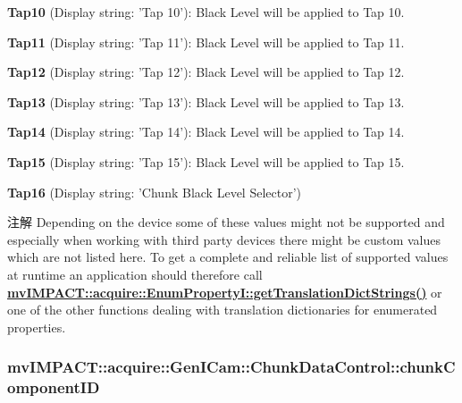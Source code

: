 \begin{DoxyItemize}
\item {\bfseries Tap10} (Display string\+: 'Tap 10')\+: Black Level will be applied to Tap 10.
\item {\bfseries Tap11} (Display string\+: 'Tap 11')\+: Black Level will be applied to Tap 11.
\item {\bfseries Tap12} (Display string\+: 'Tap 12')\+: Black Level will be applied to Tap 12.
\item {\bfseries Tap13} (Display string\+: 'Tap 13')\+: Black Level will be applied to Tap 13.
\item {\bfseries Tap14} (Display string\+: 'Tap 14')\+: Black Level will be applied to Tap 14.
\item {\bfseries Tap15} (Display string\+: 'Tap 15')\+: Black Level will be applied to Tap 15.
\item {\bfseries Tap16} (Display string\+: 'Chunk Black Level Selector')
\end{DoxyItemize}

\begin{DoxyNote}{注解}
Depending on the device some of these values might not be supported and especially when working with third party devices there might be custom values which are not listed here. To get a complete and reliable list of supported values at runtime an application should therefore call {\bfseries \hyperlink{classmv_i_m_p_a_c_t_1_1acquire_1_1_enum_property_i_a0ba6ccbf5ee69784d5d0b537924d26b6}{mv\+I\+M\+P\+A\+C\+T\+::acquire\+::\+Enum\+Property\+I\+::get\+Translation\+Dict\+Strings()}} or one of the other functions dealing with translation dictionaries for enumerated properties. 
\end{DoxyNote}
\hypertarget{classmv_i_m_p_a_c_t_1_1acquire_1_1_gen_i_cam_1_1_chunk_data_control_a303eb2c02211269edcdc7c1899270c73}{
\subsubsection[{chunk\+Component\+I\+D}]{ mv\+I\+M\+P\+A\+C\+T\+::acquire\+::\+Gen\+I\+Cam\+::\+Chunk\+Data\+Control\+::chunk\+Component\+I\+D}}\label{classmv_i_m_p_a_c_t_1_1acquire_1_1_gen_i_cam_1_1_chunk_data_control_a303eb2c02211269edcdc7c1899270c73}


